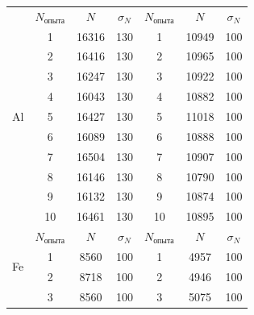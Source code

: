 \documentclass[a4paper, 12pt]{article}%
\begin{document}
\begin{table}[h]
\begin{center}
\begin{tabular}{|c|c|c|c|c|c|c|}
\hline
\multirow{11}{*}{Al} & $N_{\text{опыта}}$ & $N$   & $\sigma_N$ & $N_{\text{опыта}}$ & $N$   & $\sigma_N$ \\ \cline{2-7} 
                     & 1                  & 16316 & 130        & 1                  & 10949 & 100        \\ \cline{2-7} 
                     & 2                  & 16416 & 130        & 2                  & 10965 & 100        \\ \cline{2-7} 
                     & 3                  & 16247 & 130        & 3                  & 10922 & 100        \\ \cline{2-7} 
                     & 4                  & 16043 & 130        & 4                  & 10882 & 100        \\ \cline{2-7} 
                     & 5                  & 16427 & 130        & 5                  & 11018 & 100        \\ \cline{2-7} 
                     & 6                  & 16089 & 130        & 6                  & 10888 & 100        \\ \cline{2-7} 
                     & 7                  & 16504 & 130        & 7                  & 10907 & 100        \\ \cline{2-7} 
                     & 8                  & 16146 & 130        & 8                  & 10790 & 100        \\ \cline{2-7} 
                     & 9                  & 16132 & 130        & 9                  & 10874 & 100        \\ \cline{2-7} 
                     & 10                 & 16461 & 130        & 10                 & 10895 & 100        \\ \hline
\multirow{11}{*}{Fe} & $N_{\text{опыта}}$ & $N$   & $\sigma_N$ & $N_{\text{опыта}}$ & $N$   & $\sigma_N$ \\ \cline{2-7} 
                     & 1                  & 8560  & 100        & 1                  & 4957  & 100        \\ \cline{2-7} 
                     & 2                  & 8718  & 100        & 2                  & 4946  & 100        \\ \cline{2-7} 
                     & 3                  & 8560  & 100        & 3                  & 5075  & 100        \\ \cline{2-7} 

\end{tabular}
\end{center}
\end{table}
\end{document}
